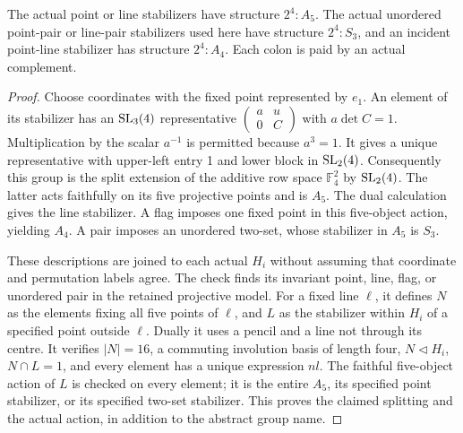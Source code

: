\documentclass[11pt]{article}
\begin{document}
\begin{lemma}\label{projective}
The actual point or line stabilizers have structure $2^4:A_5$.
The actual unordered point-pair or line-pair stabilizers used here have
structure $2^4:S_3$, and an incident point-line stabilizer has structure
$2^4:A_4$. Each colon is paid by an actual complement.
\end{lemma}
\begin{proof}
Choose coordinates with the fixed point represented by $e_1$.
An element of its stabilizer has an $\operatorname{SL}_3(4)$ representative
$\left(\begin{smallmatrix}a&u\\0&C\end{smallmatrix}\right)$ with
$a\det C=1$. Multiplication by the scalar $a^{-1}$ is permitted because
$a^3=1$. It gives a unique representative with upper-left entry 1 and
lower block in $\operatorname{SL}_2(4)$. Consequently this group is the split extension
of the additive row space $\mathbb F_4^2$ by $\operatorname{SL}_2(4)$.
The latter acts faithfully on its five projective points and is $A_5$.
The dual calculation gives the line stabilizer. A flag imposes one fixed
point in this five-object action, yielding $A_4$. A pair imposes an
unordered two-set, whose stabilizer in $A_5$ is $S_3$.

These descriptions are joined to each actual $H_i$ without assuming that
coordinate and permutation labels agree. The check finds its invariant
point, line, flag, or unordered pair in the retained projective model.
For a fixed line $\ell$, it defines $N$ as the elements fixing all five
points of $\ell$, and $L$ as the stabilizer within $H_i$ of a specified
point outside $\ell$. Dually it uses a pencil and a line not through its
centre. It verifies $|N|=16$, a commuting involution basis of length four,
$N\lhd H_i$, $N\cap L=1$, and every element has a unique expression
$nl$. The faithful five-object action of $L$ is checked on every element;
it is the entire $A_5$, its specified point stabilizer, or its specified
two-set stabilizer. This proves the claimed splitting and the actual
action, in addition to the abstract group name.
\end{proof}
\end{document}
